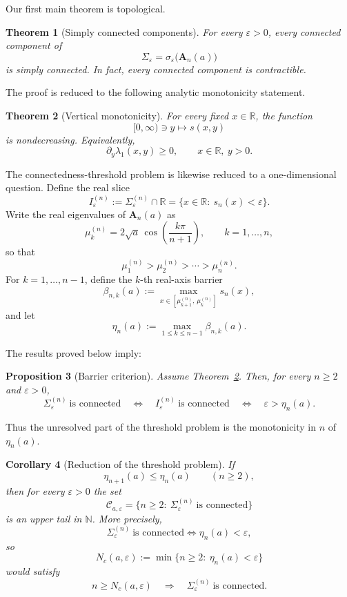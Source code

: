 \documentclass[11pt]{article}
\numberwithin{equation}{section}
\newtheorem{theorem}{Theorem}[section]
\newtheorem{proposition}[theorem]{Proposition}
\newtheorem{corollary}[theorem]{Corollary}
\newcommand{\R}{\mathbb R}
\newcommand{\N}{\mathbb N}
\newcommand{\A}{\mathbf A}
\begin{document}
Our first main theorem is topological.

\begin{theorem}[Simply connected components]\label{thm:main}
For every \(\varepsilon>0\), every connected component of
\[
\Sigma_\varepsilon=\sigma_\varepsilon\!\bigl(\A_n(a)\bigr)
\]
is simply connected.  In fact, every connected component is contractible.
\end{theorem}

The proof is reduced to the following analytic monotonicity statement.

\begin{theorem}[Vertical monotonicity]\label{thm:vertical}
For every fixed \(x\in\R\), the function
\[
[0,\infty)\ni y\longmapsto s(x,y)
\]
is nondecreasing.  Equivalently,
\[
\partial_y\lambda_1(x,y)\ge0,
\qquad x\in\R,\ y>0.
\]
\end{theorem}

The connectedness-threshold problem is likewise reduced to a one-dimensional
question.  Define the real slice
\[
I_\varepsilon^{(n)}
:=
\Sigma_\varepsilon^{(n)}\cap\R
=
\{x\in\R:\ s_n(x)<\varepsilon\}.
\]
Write the real eigenvalues of \(\A_n(a)\) as
\[
\mu_k^{(n)}=2\sqrt a\,\cos\!\left(\frac{k\pi}{n+1}\right),
\qquad
k=1,\dots,n,
\]
so that
\[
\mu_1^{(n)}>\mu_2^{(n)}>\cdots>\mu_n^{(n)}.
\]
For \(k=1,\dots,n-1\), define the \(k\)-th real-axis barrier
\[
\beta_{n,k}(a)
:=
\max_{x\in[\mu_{k+1}^{(n)},\,\mu_k^{(n)}]} s_n(x),
\]
and let
\[
\eta_n(a):=\max_{1\le k\le n-1}\beta_{n,k}(a).
\]

The results proved below imply:

\begin{proposition}[Barrier criterion]\label{prop:barrier-intro}
Assume Theorem~\ref{thm:vertical}. Then, for every \(n\ge2\) and
\(\varepsilon>0\),
\[
\Sigma_\varepsilon^{(n)}\ \text{is connected}
\quad\Longleftrightarrow\quad
I_\varepsilon^{(n)}\ \text{is connected}
\quad\Longleftrightarrow\quad
\varepsilon>\eta_n(a).
\]
\end{proposition}

Thus the unresolved part of the threshold problem is the monotonicity in \(n\) of
\(\eta_n(a)\).

\begin{corollary}[Reduction of the threshold problem]\label{cor:threshold-intro}
If
\[
\eta_{n+1}(a)\le \eta_n(a)\qquad (n\ge2),
\]
then for every \(\varepsilon>0\) the set
\[
\mathcal C_{a,\varepsilon}
=
\{n\ge2:\ \Sigma_\varepsilon^{(n)}\ \text{is connected}\}
\]
is an upper tail in \(\N\). More precisely,
\[
\Sigma_\varepsilon^{(n)}\ \text{is connected}
\iff
\eta_n(a)<\varepsilon,
\]
so
\[
N_c(a,\varepsilon):=\min\{n\ge2:\ \eta_n(a)<\varepsilon\}
\]
would satisfy
\[
n\ge N_c(a,\varepsilon)
\quad\Longrightarrow\quad
\Sigma_\varepsilon^{(n)}\ \text{is connected}.
\]
\end{corollary}
\end{document}
